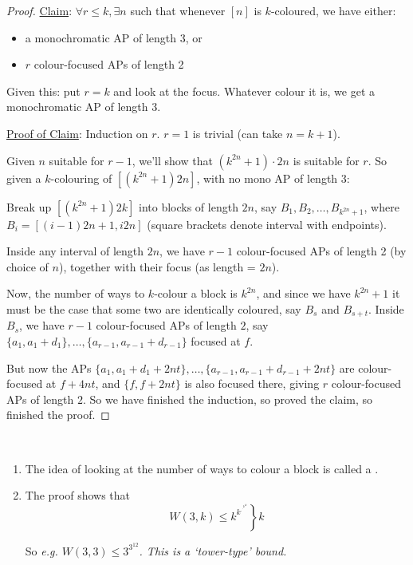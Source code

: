 \documentclass[10pt]{article}
\begin{document}
\begin{proof}
    \underline{Claim}: $\forall r \le k, \exists n$ such that whenever $[n]$ is $k$-coloured, we have either:
    \begin{itemize}
        \item a monochromatic AP of length 3, or
        \item $r$ colour-focused APs of length 2
    \end{itemize}
    Given this: put $r = k$ and look at the focus. Whatever colour it is, we get a monochromatic AP of length 3.
    
    \underline{Proof of Claim}: Induction on $r$. $r = 1$ is trivial (can take $n = k+1$).

    Given $n$ suitable for $r - 1$, we'll show that $(k^{2n}+1)\cdot 2n$ is suitable for $r$. So given a $k$-colouring of $[(k^{2n}+1)2n]$, with no mono AP of length 3:

    Break up $[(k^{2n}+1)2k]$ into blocks of length $2n$, say $B_1,B_2,\dots,B_{k^{2n}+1}$, where $B_i = [(i-1)2n+1,i2n]$ (square brackets denote interval with endpoints).

    Inside any interval of length $2n$, we have $r-1$ colour-focused APs of length 2 (by choice of $n$), together with their focus (as length = $2n$).

    Now, the number of ways to $k$-colour a block is $k^{2n}$, and since we have $k^{2n}+1$ it must be the case that some two are identically coloured, say $B_s$ and $B_{s+t}$. Inside $B_s$, we have $r-1$ colour-focused APs of length $2$, say $\{a_1,a_1+d_1\},\dots,\{a_{r-1},a_{r-1}+d_{r-1}\}$ focused at $f$.

    But now the APs $\{a_1,a_1+d_1+2nt\},\dots,\{a_{r-1},a_{r-1}+d_{r-1}+2nt\}$ are colour-focused at $f + 4nt$, and $\{f,f+2nt\}$ is also focused there, giving $r$ colour-focused APs of length $2$. So we have finished the induction, so proved the claim, so finished the proof.
\end{proof}
\begin{remark*}[Remarks]\ 
    \begin{enumerate}
        \item The idea of looking at the number of ways to colour a block is called a .
        
        \item The proof shows that $$W(3,k) \le \left. k^{k^{.^{.^{k^{4k}}}}}\right\rbrace k$$
        
        So \it{e.g.} $W(3,3)\le 3^{3^{12}}$. This is a `tower-type' bound.
    \end{enumerate}
\end{remark*}
\end{document}
